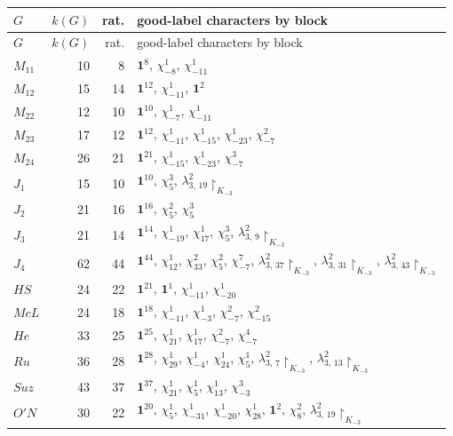 \normalfont
\begingroup
\footnotesize
\setlength{\tabcolsep}{3pt}
\renewcommand{\arraystretch}{1.1}
\begin{longtable}{@{}lrrp{}@{}}
\toprule
$G$ & $k(G)$ & rat. & good-label characters by block\\
\midrule
\endfirsthead
\toprule
$G$ & $k(G)$ & rat. & good-label characters by block\\
\midrule
\endhead
$M_{11}$ & 10 & 8 & $\mathbf 1^{8}$, $\chi_{-8}^{1}$, $\chi_{-11}^{1}$\\
$M_{12}$ & 15 & 14 & $\mathbf 1^{12}$, $\chi_{-11}^{1}$, $\mathbf 1^{2}$\\
$M_{22}$ & 12 & 10 & $\mathbf 1^{10}$, $\chi_{-7}^{1}$, $\chi_{-11}^{1}$\\
$M_{23}$ & 17 & 12 & $\mathbf 1^{12}$, $\chi_{-11}^{1}$, $\chi_{-15}^{1}$, $\chi_{-23}^{1}$, $\chi_{-7}^{2}$\\
$M_{24}$ & 26 & 21 & $\mathbf 1^{21}$, $\chi_{-15}^{1}$, $\chi_{-23}^{1}$, $\chi_{-7}^{3}$\\
$J_1$ & 15 & 10 & $\mathbf 1^{10}$, $\chi_{5}^{3}$, $\lambda^{2}_{3,\,19}\!\!\restriction_{K_{-3}}$\\
$J_2$ & 21 & 16 & $\mathbf 1^{16}$, $\chi_{5}^{2}$, $\chi_{5}^{3}$\\
$J_3$ & 21 & 14 & $\mathbf 1^{14}$, $\chi_{-19}^{1}$, $\chi_{17}^{1}$, $\chi_{5}^{3}$, $\lambda^{2}_{3,\,9}\!\!\restriction_{K_{-3}}$\\
$J_4$ & 62 & 44 & $\mathbf 1^{44}$, $\chi_{12}^{1}$, $\chi_{33}^{2}$, $\chi_{5}^{2}$, $\chi_{-7}^{7}$, $\lambda^{2}_{3,\,37}\!\!\restriction_{K_{-3}}$, $\lambda^{2}_{3,\,31}\!\!\restriction_{K_{-3}}$, $\lambda^{2}_{3,\,43}\!\!\restriction_{K_{-3}}$\\
$HS$ & 24 & 22 & $\mathbf 1^{21}$, $\mathbf 1^{1}$, $\chi_{-11}^{1}$, $\chi_{-20}^{1}$\\
$McL$ & 24 & 18 & $\mathbf 1^{18}$, $\chi_{-11}^{1}$, $\chi_{-3}^{1}$, $\chi_{-7}^{2}$, $\chi_{-15}^{2}$\\
$He$ & 33 & 25 & $\mathbf 1^{25}$, $\chi_{21}^{1}$, $\chi_{17}^{1}$, $\chi_{-7}^{2}$, $\chi_{-7}^{4}$\\
$Ru$ & 36 & 28 & $\mathbf 1^{28}$, $\chi_{29}^{1}$, $\chi_{-4}^{1}$, $\chi_{24}^{1}$, $\chi_{5}^{1}$, $\lambda^{2}_{3,\,7}\!\!\restriction_{K_{-3}}$, $\lambda^{2}_{3,\,13}\!\!\restriction_{K_{-3}}$\\
$Suz$ & 43 & 37 & $\mathbf 1^{37}$, $\chi_{21}^{1}$, $\chi_{5}^{1}$, $\chi_{13}^{1}$, $\chi_{-3}^{3}$\\
$O'N$ & 30 & 22 & $\mathbf 1^{20}$, $\chi_{5}^{1}$, $\chi_{-31}^{1}$, $\chi_{-20}^{1}$, $\chi_{28}^{1}$, $\mathbf 1^{2}$, $\chi_{8}^{2}$, $\lambda^{2}_{3,\,19}\!\!\restriction_{K_{-3}}$\\

\end{longtable}
